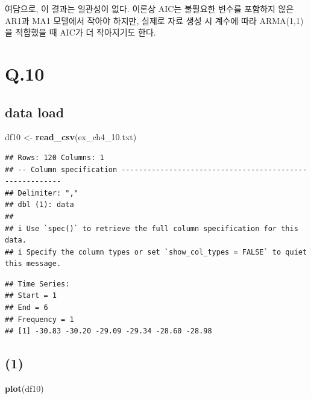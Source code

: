 \documentclass[
]{article}
\newenvironment{Shaded}{\begin{snugshade}}{\end{snugshade}}
\newcommand{\FunctionTok}[1]{\textcolor[rgb]{0.13,0.29,0.53}{\textbf{#1}}}
\newcommand{\NormalTok}[1]{#1}
\newcommand{\OtherTok}[1]{\textcolor[rgb]{0.56,0.35,0.01}{#1}}
\newcommand{\SpecialCharTok}[1]{\textcolor[rgb]{0.81,0.36,0.00}{\textbf{#1}}}
\newcommand{\StringTok}[1]{\textcolor[rgb]{0.31,0.60,0.02}{#1}}
\begin{document}
여담으로, 이 결과는 일관성이 없다. 이론상 AIC는 불필요한 변수를 포함하지
않은 AR1과 MA1 모델에서 작아야 하지만, 실제로 자료 생성 시 계수에 따라
ARMA(1,1)을 적합했을 때 AIC가 더 작아지기도 한다.

\section{Q.10}\label{q.10}

\subsection{data load}\label{data-load}

\begin{Shaded}
\begin{Highlighting}[]
\NormalTok{df10 }\OtherTok{\textless{}{-}} \FunctionTok{read\_csv}\NormalTok{(}\StringTok{\textquotesingle{}ex\_ch4\_10.txt\textquotesingle{}}\NormalTok{)}
\end{Highlighting}
\end{Shaded}

\begin{verbatim}
## Rows: 120 Columns: 1
## -- Column specification --------------------------------------------------------
## Delimiter: ","
## dbl (1): data
## 
## i Use `spec()` to retrieve the full column specification for this data.
## i Specify the column types or set `show_col_types = FALSE` to quiet this message.
\end{verbatim}

\begin{Shaded}
\end{Shaded}

\begin{verbatim}
## Time Series:
## Start = 1 
## End = 6 
## Frequency = 1 
## [1] -30.83 -30.20 -29.09 -29.34 -28.60 -28.98
\end{verbatim}

\subsection{(1)}\label{section}

\begin{Shaded}
\begin{Highlighting}[]
\FunctionTok{plot}\NormalTok{(df10)}
\end{Highlighting}
\end{Shaded}
\end{document}
